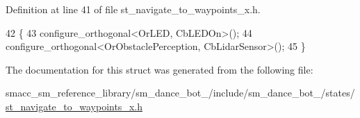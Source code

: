 Definition at line 41 of file st\+\_\+navigate\+\_\+to\+\_\+waypoints\+\_\+x.\+h.


\begin{DoxyCode}
42   \{
43     configure\_orthogonal<OrLED, CbLEDOn>();
44     configure\_orthogonal<OrObstaclePerception, CbLidarSensor>();
45   \}
\end{DoxyCode}


The documentation for this struct was generated from the following file\+:\begin{DoxyCompactItemize}
\item 
smacc\+\_\+sm\+\_\+reference\+\_\+library/sm\+\_\+dance\+\_\+bot\+\_/include/sm\+\_\+dance\+\_\+bot\+\_/states/\hyperlink{3_2include_2sm__dance__bot__3_2states_2st__navigate__to__waypoints__x_8h}{st\+\_\+navigate\+\_\+to\+\_\+waypoints\+\_\+x.\+h}\end{DoxyCompactItemize}
